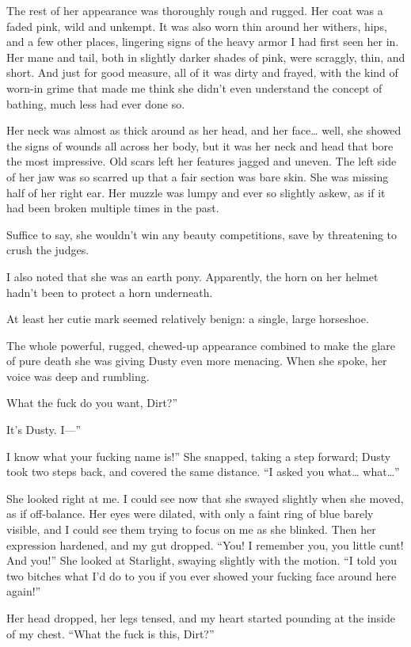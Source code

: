 The rest of her appearance was thoroughly rough and rugged. Her coat was a faded pink, wild and unkempt. It was also worn thin around her withers, hips, and a few other places, lingering signs of the heavy armor I had first seen her in. Her mane and tail, both in slightly darker shades of pink, were scraggly, thin, and short. And just for good measure, all of it was dirty and frayed, with the kind of worn-in grime that made me think she didn’t even understand the concept of bathing, much less had ever done so.

Her neck was almost as thick around as her head, and her face… well, she showed the signs of wounds all across her body, but it was her neck and head that bore the most impressive. Old scars left her features jagged and uneven. The left side of her jaw was so scarred up that a fair section was bare skin. She was missing half of her right ear. Her muzzle was lumpy and ever so slightly askew, as if it had been broken multiple times in the past.

Suffice to say, she wouldn’t win any beauty competitions, save by threatening to crush the judges.

I also noted that she was an earth pony. Apparently, the horn on her helmet hadn’t been to protect a horn underneath.

At least her cutie mark seemed relatively benign: a single, large horseshoe.

The whole powerful, rugged, chewed-up appearance combined to make the glare of pure death she was giving Dusty even more menacing. When she spoke, her voice was deep and rumbling.

\leavevmode{}What the fuck do you want, Dirt?”

\leavevmode{}It’s Dusty. I—”

\leavevmode{}I know what your fucking name is!” She snapped, taking a step forward; Dusty took two steps back, and covered the same distance. “I asked you what… what…”

She looked right at me. I could see now that she swayed slightly when she moved, as if off-balance. Her eyes were dilated, with only a faint ring of blue barely visible, and I could see them trying to focus on me as she blinked. Then her expression hardened, and my gut dropped. “You! I remember you, you little cunt! And you!” She looked at Starlight, swaying slightly with the motion. “I told you two bitches what I’d do to you if you ever showed your fucking face around here again!”

Her head dropped, her legs tensed, and my heart started pounding at the inside of my chest. “What the fuck is this, Dirt?”

